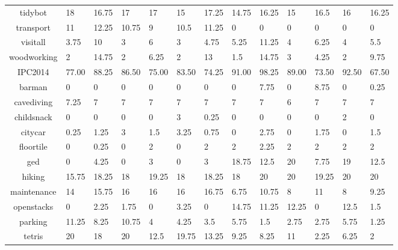 \begin{table*}[htbp]
\begin{tabularx}{\linewidth}{|c|X|X|X|X|X|X||X|X|X|X|X|X|}
tidybot         & 18     & 16.75  & 17     & 17     & 15     & 17.25  & 14.75  & 16.25  & 15     & 16.5   & 16     & 16.25  \\ 
transport       & 11     & 12.25  & 10.75  & 9      & 10.5   & 11.25  & 0      & 0      & 0      & 0      & 0      & 0      \\ 
visitall        & 3.75   & 10     & 3      & 6      & 3      & 4.75   & 5.25   & 11.25  & 4      & 6.25   & 4      & 5.5    \\ 
woodworking     & 2      & 14.75  & 2      & 6.25   & 2      & 13     & 1.5    & 14.75  & 3      & 4.25   & 2      & 9.75   \\[0.3em]
IPC2014         & 77.00  & 88.25  & 86.50  & 75.00  & 83.50  & 74.25  & 91.00  & 98.25  & 89.00  & 73.50  & 92.50  & 67.50  \\[0.3em]
barman          & 0      & 0      & 0      & 0      & 0      & 0      & 0      & 7.75   & 0      & 8.75   & 0      & 0.25   \\ 
cavediving      & 7.25   & 7      & 7      & 7      & 7      & 7      & 7      & 7      & 6      & 7      & 7      & 7      \\ 
childsnack      & 0      & 0      & 0      & 0      & 3      & 0.25   & 0      & 0      & 0      & 0      & 2      & 0      \\ 
citycar         & 0.25   & 1.25   & 3      & 1.5    & 3.25   & 0.75   & 0      & 2.75   & 0      & 1.75   & 0      & 1.5    \\ 
floortile       & 0      & 0.25   & 0      & 2      & 0      & 2      & 2      & 2.25   & 2      & 2      & 2      & 2      \\ 
ged             & 0      & 4.25   & 0      & 3      & 0      & 3      & 18.75  & 12.5   & 20     & 7.75   & 19     & 12.5   \\ 
hiking          & 15.75  & 18.25  & 18     & 19.25  & 18     & 18.25  & 18     & 20     & 20     & 19.25  & 20     & 20     \\ 
maintenance     & 14     & 15.75  & 16     & 16     & 16     & 16.75  & 6.75   & 10.75  & 8      & 11     & 8      & 9.25   \\ 
openstacks      & 0      & 2.25   & 1.75   & 0      & 3.25   & 0      & 14.75  & 11.25  & 12.25  & 0      & 12.5   & 1.5    \\ 
parking         & 11.25  & 8.25   & 10.75  & 4      & 4.25   & 3.5    & 5.75   & 1.5    & 2.75   & 2.75   & 5.75   & 1.25   \\ 
tetris          & 20     & 18     & 20     & 12.5   & 19.75  & 13.25  & 9.25   & 8.25   & 11     & 2.25   & 6.25   & 2      \\ 

\end{tabularx}
\end{table*}
